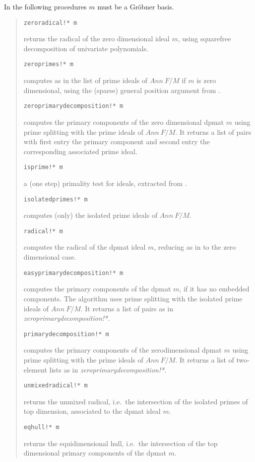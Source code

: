 \documentclass[a4paper,11pt]{article}
\newcommand{\gr}{Gr\"obner}
\newcommand{\pbx}[1]{\mbox{}\hfill \parbox[t]{12cm}{#1} \pagebreak[3]}
\begin{document}
In the following procedures $m$ must be a {\gr} basis.
\begin{quote}
\verb|zeroradical!* m| 

\pbx{returns the radical of the zero dimensional ideal $m$, using
squarefree decomposition of univariate polynomials.}

\verb|zeroprimes!* m| 

\pbx{computes as in \cite{GTZ} the list of prime ideals of $Ann\ F/M$
if $m$ is zero dimensional, using the (sparse) general position
argument from \cite{KW}.}

\verb|zeroprimarydecomposition!* m| 

\pbx{computes the primary components of the zero dimensional dpmat $m$
using prime splitting with the prime ideals of $Ann\ F/M$. It returns
a list of pairs with first entry the primary component
and second entry the corresponding associated prime ideal.}

\verb|isprime!* m| 

\pbx{a (one step) primality test for ideals, extracted from
\cite{GTZ}.} 

\verb|isolatedprimes!* m| 

\pbx{computes (only) the isolated prime ideals of $Ann\ F/M$.}

\verb|radical!* m| 

\pbx{computes the radical of the dpmat ideal $m$, reducing as in
\cite{GTZ} to the zero dimensional case.}

\verb|easyprimarydecomposition!* m| 

\pbx{computes the primary components of the dpmat $m$, if it has no
embedded components. The algorithm uses prime splitting with the
isolated prime ideals of $Ann\ F/M$. It returns a list of pairs as in
{\em zeroprimarydecomposition!*}.} 

\verb|primarydecomposition!* m| 

\pbx{computes the primary components of the zerodimensional dpmat $m$
using prime splitting with the prime ideals of $Ann\ F/M$. It returns
a list of two-element lists as in {\em zeroprimarydecomposition!*}.}

\verb|unmixedradical!* m| 

\pbx{returns the unmixed radical, i.e.\ the intersection of the
isolated primes of top dimension, associated to the dpmat ideal $m$.}

\verb|eqhull!* m| 

\pbx{returns the equidimensional hull, i.e.\ the intersection of the 
 top dimensional primary components of the dpmat $m$.}
\end{quote}
\end{document}
